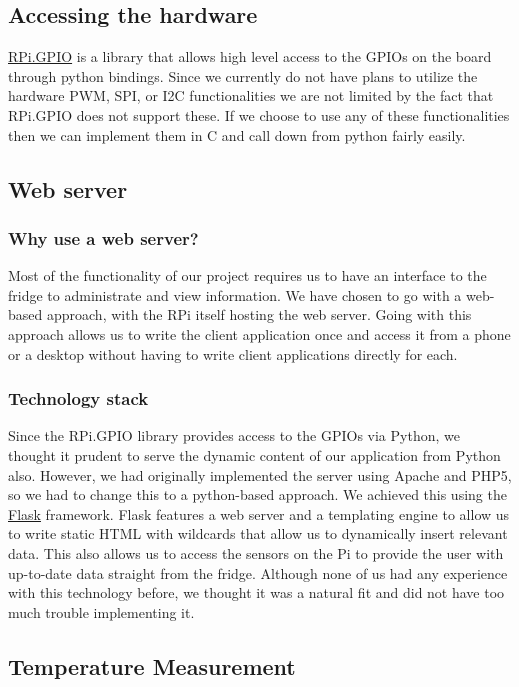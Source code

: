 \documentclass[10pt]{article}
\begin{document}
\subsection{Accessing the hardware}
\hyperref[https://pypi.python.org/pypi/RPi.GPIO]{RPi.GPIO} is a library that allows high level access to the GPIOs on the board through python bindings. Since we currently do not have plans to utilize the hardware PWM, SPI, or I2C functionalities we are not limited by the fact that RPi.GPIO does not support these. If we choose to use any of these functionalities then we can implement them in C and call down from python fairly easily.

\subsection{Web server}
\subsubsection{Why use a web server?}

Most of the functionality of our project requires us to have an interface to the fridge to administrate and view information. We have chosen to go with a web-based approach, with the RPi itself hosting the web server. Going with this approach allows us to write the client application once and access it from a phone or a desktop without having to write client applications directly for each.

\subsubsection{Technology stack}

Since the RPi.GPIO library provides access to the GPIOs via Python, we thought it prudent to serve the dynamic content of our application from Python also. However, we had originally implemented the server using Apache and PHP5, so we had to change this to a python-based approach. We achieved this using the \hyperref[http://flask.pocoo.org/]{Flask} framework. Flask features a web server and a templating engine to allow us to write static HTML with wildcards that allow us to dynamically insert relevant data. This also allows us to access the sensors on the Pi to provide the user with up-to-date data straight from the fridge. Although none of us had any experience with this technology before, we thought it was a natural fit and did not have too much trouble implementing it.

\subsection{Temperature Measurement}
\end{document}
